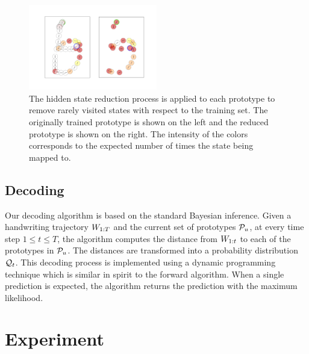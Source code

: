 \documentclass{sigchi}
\begin{document}
\begin{figure}[h]
  \centering
  \includegraphics[width=0.5\textwidth] {figures/state_reduction.png}
  \caption{The hidden state reduction process is applied to each
    prototype to remove rarely visited states with respect to the
    training set. The originally trained prototype is shown on the
    left and the reduced prototype is shown on the right. The
    intensity of the colors corresponds to the expected number of
    times the state being mapped to. }
  \label{fig:state_reduction}
\end{figure}

\subsection{Decoding}

Our decoding algorithm is based on the standard Bayesian inference.
Given a handwriting trajectory $W_{1:{T}}$ and the current set of
prototypes $\mathcal{P}_u$, at every time step $1 \le t \le T$, the
algorithm computes the distance from $W_{1:{t}}$ to each of the
prototypes in $\mathcal{P}_u$. The distances are transformed into a
probability distribution $\mathcal{Q}_{t}$. This decoding process is
implemented using a dynamic programming technique which is similar in
spirit to the forward algorithm. When a single prediction is expected,
the algorithm returns the prediction with the maximum likelihood.


\section{Experiment}
\label{sec:experiment}
\end{document}
